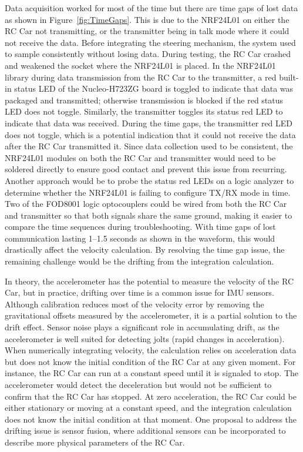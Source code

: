\documentclass[conference]{IEEEtran}
\begin{document}
	Data acquisition worked for most of the time but there are time gaps of lost
	data as shown in Figure~\ref{fig:TimeGaps}. This is due to the NRF24L01 on
	either the RC Car not transmitting, or the transmitter being in talk mode where
	it could not receive the data. Before integrating the steering mechanism, the
	system used to sample consistently without losing data. During testing, the RC
	Car crashed and weakened the socket where the NRF24L01 is placed. In the
	NRF24L01 library during data transmission from the RC Car to the transmitter, a
	red built-in status LED of the Nucleo-H723ZG board is toggled to indicate that
	data was packaged and transmitted; otherwise transmission is blocked if the red
	status LED does not toggle. Similarly, the transmitter toggles its status red
	LED to indicate that data was received. During the time gaps, the transmitter
	red LED does not toggle, which is a potential indication that it could not
	receive the data after the RC Car transmitted it. Since data collection used to
	be consistent, the NRF24L01 modules on both the RC Car and transmitter would
	need to be soldered directly to ensure good contact and prevent this issue from
	recurring. Another approach would be to probe the status red LEDs on a logic
	analyzer to determine whether the NRF24L01 is failing to configure TX/RX mode
	in time. Two of the FOD8001 logic optocouplers could be wired from both the RC
	Car and transmitter so that both signals share the same ground, making it
	easier to compare the time sequences during troubleshooting. With time gaps of
	lost communication lasting 1--1.5 seconds as shown in the waveform, this would
	drastically affect the velocity calculation. By resolving the time gap issue,
	the remaining challenge would be the drifting from the integration calculation.
	
	In theory, the accelerometer has the potential to measure the velocity of the
	RC Car, but in practice, drifting over time is a common issue for IMU sensors.
	Although calibration reduces most of the velocity error by removing the
	gravitational offsets measured by the accelerometer, it is a partial solution
	to the drift effect. Sensor noise plays a significant role in accumulating
	drift, as the accelerometer is well suited for detecting jolts (rapid changes
	in acceleration). When numerically integrating velocity, the calculation relies
	on acceleration data but does not know the initial condition of the RC Car at
	any given moment. For instance, the RC Car can run at a constant speed until it
	is signaled to stop. The accelerometer would detect the deceleration but would
	not be sufficient to confirm that the RC Car has stopped. At zero acceleration,
	the RC Car could be either stationary or moving at a constant speed, and the
	integration calculation does not know the initial condition at that moment. One
	proposal to address the drifting issue is sensor fusion, where additional
	sensors can be incorporated to describe more physical parameters of the RC Car.
	
\end{document}
